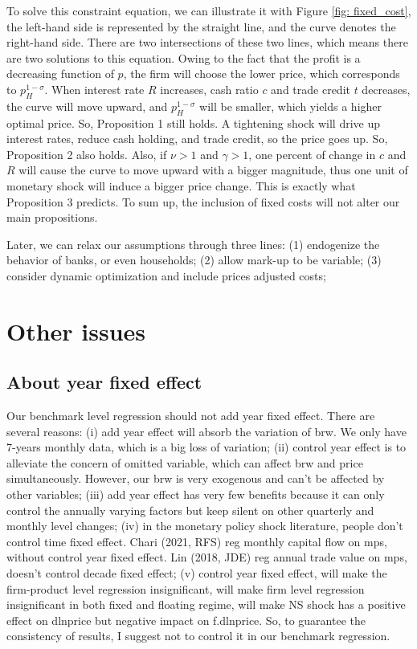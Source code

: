 \documentclass[12pt]{article}
\begin{document}
To solve this constraint equation, we can illustrate it with Figure \ref{fig: fixed_cost}, the left-hand side is represented by the straight line, and the curve denotes the right-hand side. There are two intersections of these two lines, which means there are two solutions to this equation. Owing to the fact that the profit is a decreasing function of $p$, the firm will choose the lower price, which corresponds to $p_H^{1-\sigma}$. When interest rate $R$ increases, cash ratio $c$ and trade credit $t$ decreases, the curve will move upward, and $p_H^{1-\sigma}$ will be smaller, which yields a higher optimal price. So, Proposition 1 still holds. A tightening shock will drive up interest rates, reduce cash holding, and trade credit, so the price goes up. So, Proposition 2 also holds. Also, if $\nu>1$ and $\gamma>1$, one percent of change in $c$ and $R$ will cause the curve to move upward with a bigger magnitude, thus one unit of monetary shock will induce a bigger price change. This is exactly what Proposition 3 predicts. To sum up, the inclusion of fixed costs will not alter our main propositions.


Later, we can relax our assumptions through three lines: (1) endogenize the behavior of banks, or even households; (2) allow mark-up to be variable; (3) consider dynamic optimization and include prices adjusted costs;

\section{Other issues}

\subsection{About year fixed effect}
Our benchmark level regression should not add year fixed effect. There are several reasons: (i) add year effect will absorb the variation of brw. We only have 7-years monthly data, which is a big loss of variation; (ii) control year effect is to alleviate the concern of omitted variable, which can affect brw and price simultaneously. However, our brw is very exogenous and can’t be affected by other variables; (iii) add year effect has very few benefits because it can only control the annually varying factors but keep silent on other quarterly and monthly level changes; (iv) in the monetary policy shock literature, people don’t control time fixed effect. Chari (2021, RFS) reg monthly capital flow on mps, without control year fixed effect. Lin (2018, JDE) reg annual trade value on mps, doesn’t control decade fixed effect; (v) control year fixed effect, will make the firm-product level regression insignificant, will make firm level regression insignificant in both fixed and floating regime, will make NS shock has a positive effect on dlnprice but negative impact on f.dlnprice. So, to guarantee the consistency of results, I suggest not to control it in our benchmark regression.
\end{document}
